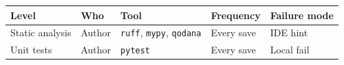 \documentclass[
  11pt,
  british,
  oneside]{book}
\begin{document}
\begin{longtable}[]{@{}lllll@{}}
\toprule
\begin{minipage}[b]{0.17\columnwidth}\raggedright
Level\strut
\end{minipage} & \begin{minipage}[b]{0.17\columnwidth}\raggedright
Who\strut
\end{minipage} & \begin{minipage}[b]{0.17\columnwidth}\raggedright
Tool\strut
\end{minipage} & \begin{minipage}[b]{0.17\columnwidth}\raggedright
Frequency\strut
\end{minipage} & \begin{minipage}[b]{0.17\columnwidth}\raggedright
Failure mode\strut
\end{minipage}\tabularnewline
\midrule
\endhead
\begin{minipage}[t]{0.17\columnwidth}\raggedright
Static analysis\strut
\end{minipage} & \begin{minipage}[t]{0.17\columnwidth}\raggedright
Author\strut
\end{minipage} & \begin{minipage}[t]{0.17\columnwidth}\raggedright
\texttt{ruff}, \texttt{mypy}, \texttt{qodana}\strut
\end{minipage} & \begin{minipage}[t]{0.17\columnwidth}\raggedright
Every save\strut
\end{minipage} & \begin{minipage}[t]{0.17\columnwidth}\raggedright
IDE hint\strut
\end{minipage}\tabularnewline
\begin{minipage}[t]{0.17\columnwidth}\raggedright
Unit tests\strut
\end{minipage} & \begin{minipage}[t]{0.17\columnwidth}\raggedright
Author\strut
\end{minipage} & \begin{minipage}[t]{0.17\columnwidth}\raggedright
\texttt{pytest}\strut
\end{minipage} & \begin{minipage}[t]{0.17\columnwidth}\raggedright
Every save\strut
\end{minipage} & \begin{minipage}[t]{0.17\columnwidth}\raggedright
Local fail\strut
\end{minipage}\tabularnewline

\end{longtable}
\end{document}
